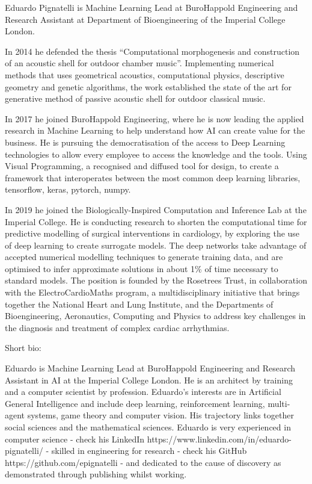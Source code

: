 Eduardo Pignatelli is Machine Learning Lead at BuroHappold Engineering and Research Assistant at Department of Bioengineering of the Imperial College London.

In 2014 he defended the thesis “Computational morphogenesis and construction of an acoustic shell for outdoor chamber music”. Implementing numerical methods that uses geometrical acoustics, computational physics, descriptive geometry and genetic algorithms, the work established the state of the art for generative method of passive acoustic shell for outdoor classical music.

In 2017 he joined BuroHappold Engineering, where he is now leading the applied research in Machine Learning to help understand how AI can create value for the business. He is pursuing the democratisation of the access to Deep Learning technologies to allow every employee to access the knowledge and the tools. Using Visual Programming, a recognised and diffused tool for design, to create a framework that interoperates between the most common deep learning libraries, tensorflow, keras, pytorch, numpy.

In 2019 he joined the Biologically-Inspired Computation and Inference Lab at the Imperial College. He is conducting research to shorten the computational time for predictive modelling of surgical interventions in cardiology, by exploring the use of deep learning to create surrogate models. The deep networks take advantage of accepted numerical modelling techniques to generate training data, and are optimised to infer approximate solutions in about 1\% of time necessary to standard models. The position is founded by the Rosetrees Trust, in collaboration with the ElectroCardioMaths program, a multidisciplinary initiative that brings together the National Heart and Lung Institute, and the Departments of Bioengineering, Aeronautics, Computing and Physics to address key challenges in the diagnosis and treatment of complex cardiac arrhythmias.


Short bio:

Eduardo is Machine Learning Lead at BuroHappold Engineering and Research Assistant in AI at the Imperial College London. He is an architect by training and a computer scientist by profession. Eduardo's interests are in Artificial General Intelligence and include deep learning, reinforcement learning, multi-agent systems, game theory and computer vision. His trajectory links together social sciences and the mathematical sciences. Eduardo is very experienced in computer science - check his LinkedIn https://www.linkedin.com/in/eduardo-pignatelli/ - skilled in engineering for research - check his GitHub https://github.com/epignatelli - and dedicated to the cause of discovery as demonstrated through publishing whilst working.